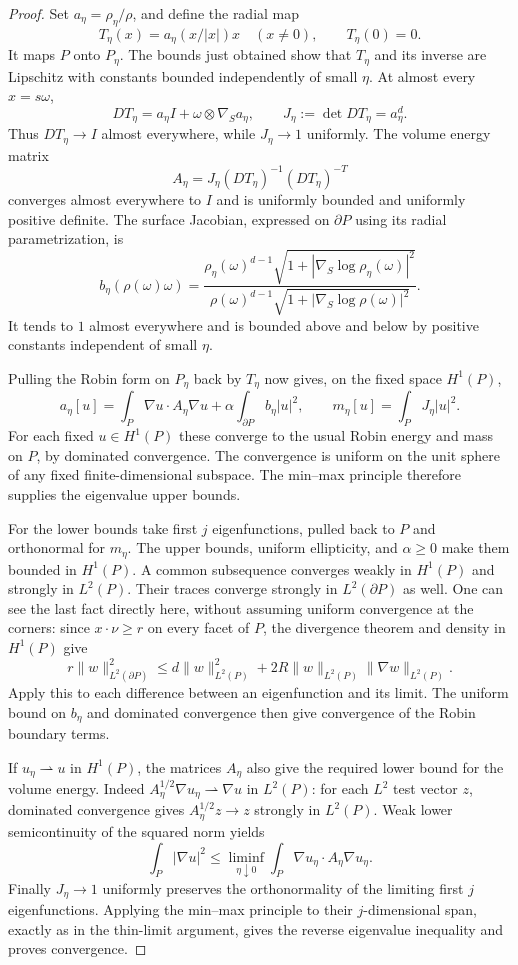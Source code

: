 \documentclass[11pt,a4paper]{article}
\theoremstyle{definition}\newtheorem{definition}[theorem]{Definition}
\theoremstyle{remark}\newtheorem{remark}[theorem]{Remark}
\begin{document}
\begin{proof}
Set $a_\eta=\rho_\eta/\rho$, and define the radial map
\[
 T_\eta(x)=a_\eta(x/|x|)x\quad(x\ne0),\qquad T_\eta(0)=0.
\]
It maps $P$ onto $P_\eta$. The bounds just obtained show that $T_\eta$
and its inverse are Lipschitz with constants bounded independently of
small $\eta$. At almost every $x=s\omega$,
\[
 DT_\eta=a_\eta I+\omega\otimes\nabla_{\!S}a_\eta,
 \qquad J_\eta:=\det DT_\eta=a_\eta^d.
\]
Thus $DT_\eta\to I$ almost everywhere, while $J_\eta\to1$ uniformly.
The volume energy matrix
\[
 A_\eta=J_\eta(DT_\eta)^{-1}(DT_\eta)^{-T}
\]
converges almost everywhere to $I$ and is uniformly bounded and
uniformly positive definite. The surface Jacobian, expressed on
$\partial P$ using its radial parametrization, is
\[
 b_\eta(\rho(\omega)\omega)
 =\frac{\rho_\eta(\omega)^{d-1}
       \sqrt{1+|\nabla_{\!S}\log\rho_\eta(\omega)|^2}}
       {\rho(\omega)^{d-1}
       \sqrt{1+|\nabla_{\!S}\log\rho(\omega)|^2}}.
\]
It tends to $1$ almost everywhere and is bounded above and below by
positive constants independent of small $\eta$.

Pulling the Robin form on $P_\eta$ back by $T_\eta$ now gives, on the
fixed space $H^1(P)$,
\[
 a_\eta[u]=\int_P\nabla u\cdot A_\eta\nabla u
       +\alpha\int_{\partial P}b_\eta|u|^2,
 \qquad m_\eta[u]=\int_P J_\eta|u|^2.
\]
For each fixed $u\in H^1(P)$ these converge to the usual Robin energy
and mass on $P$, by dominated convergence. The convergence is uniform
on the unit sphere of any fixed finite-dimensional subspace. The
min--max principle therefore supplies the eigenvalue upper bounds.

For the lower bounds take first $j$ eigenfunctions, pulled back to $P$
and orthonormal for $m_\eta$. The upper bounds, uniform ellipticity,
and $\alpha\geq0$ make them bounded in $H^1(P)$. A common subsequence
converges weakly in $H^1(P)$ and strongly in $L^2(P)$. Their traces
converge strongly in $L^2(\partial P)$ as well. One can see the last
fact directly here, without assuming uniform convergence at the
corners: since $x\cdot\nu\geq r$ on every facet of $P$, the divergence
theorem and density in $H^1(P)$ give
\[
 r\|w\|_{L^2(\partial P)}^2
 \leq d\|w\|_{L^2(P)}^2
       +2R\|w\|_{L^2(P)}\|\nabla w\|_{L^2(P)}.
\]
Apply this to each difference between an eigenfunction and its limit.
The uniform bound on $b_\eta$ and dominated convergence then give
convergence of the Robin boundary terms.

If $u_\eta\rightharpoonup u$ in $H^1(P)$, the matrices $A_\eta$ also
give the required lower bound for the volume energy. Indeed
$A_\eta^{1/2}\nabla u_\eta\rightharpoonup\nabla u$ in $L^2(P)$:
for each $L^2$ test vector $z$, dominated convergence gives
$A_\eta^{1/2}z\to z$ strongly in $L^2(P)$. Weak lower
semicontinuity of the squared norm yields
\[
 \int_P|\nabla u|^2
 \leq\liminf_{\eta\downarrow0}
       \int_P\nabla u_\eta\cdot A_\eta\nabla u_\eta.
\]
Finally $J_\eta\to1$ uniformly preserves the orthonormality of the
limiting first $j$ eigenfunctions. Applying the min--max principle to
their $j$-dimensional span, exactly as in the thin-limit argument,
gives the reverse eigenvalue inequality and proves convergence.
\end{proof}
\end{document}
